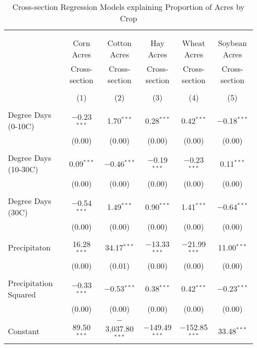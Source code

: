 \documentclass[10pt]{article}
\begin{document}
\begin{table}[!htbp] \centering 
  \caption{Cross-section Regression Models explaining Proportion of Acres by Crop} 
  \label{} 
\footnotesize 
\begin{tabular}{@{\extracolsep{5pt}}lccccc} 
\\[-1.8ex]\hline 
\hline \\[-1.8ex] 
\\[-1.8ex] & Corn Acres & Cotton Acres & Hay Acres & Wheat Acres & Soybean Acres \\ 
 & Cross-section & Cross-section & Cross-section & Cross-section & Cross-section \\ 
\\[-1.8ex] & (1) & (2) & (3) & (4) & (5)\\ 
\hline \\[-1.8ex] 
 Degree Days (0-10C) & $-$0.23$^{***}$ & 1.70$^{***}$ & 0.28$^{***}$ & 0.42$^{***}$ & $-$0.18$^{***}$ \\ 
  & (0.00) & (0.00) & (0.00) & (0.00) & (0.00) \\ 
  & & & & & \\ 
 Degree Days (10-30C) & 0.09$^{***}$ & $-$0.46$^{***}$ & $-$0.19$^{***}$ & $-$0.23$^{***}$ & 0.11$^{***}$ \\ 
  & (0.00) & (0.00) & (0.00) & (0.00) & (0.00) \\ 
  & & & & & \\ 
 Degree Days (30C) & $-$0.54$^{***}$ & 1.49$^{***}$ & 0.90$^{***}$ & 1.41$^{***}$ & $-$0.64$^{***}$ \\ 
  & (0.00) & (0.00) & (0.00) & (0.00) & (0.00) \\ 
  & & & & & \\ 
 Precipitaton & 16.28$^{***}$ & 34.17$^{***}$ & $-$13.33$^{***}$ & $-$21.99$^{***}$ & 11.00$^{***}$ \\ 
  & (0.00) & (0.01) & (0.00) & (0.00) & (0.00) \\ 
  & & & & & \\ 
 Precipitation Squared & $-$0.33$^{***}$ & $-$0.53$^{***}$ & 0.38$^{***}$ & 0.42$^{***}$ & $-$0.23$^{***}$ \\ 
  & (0.00) & (0.00) & (0.00) & (0.00) & (0.00) \\ 
  & & & & & \\ 
 Constant & 89.50$^{***}$ & $-$3,037.80$^{***}$ & $-$149.49$^{***}$ & $-$152.85$^{***}$ & 33.48$^{***}$ \\ 

\end{tabular}
\end{table}
\end{document}
